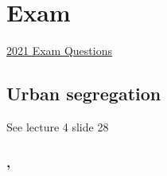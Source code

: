 \documentclass{article}
\begin{document}
\section{Exam}

\href{https://bakexamenwiki.wordpress.com/urban-geography/?fbclid=IwAR1qxA_V_G9I3NVC_17dFMUmEMLisoLB-XfgdqZmQNxIsUydvhO_ZnCOFVU}{2021 Exam Questions}

\subsection{Urban segregation}

See lecture 4 slide 28


\subsubsection{, \textit{}}

\begin{outline}
	\1
\end{outline}


\fi
\end{document}
